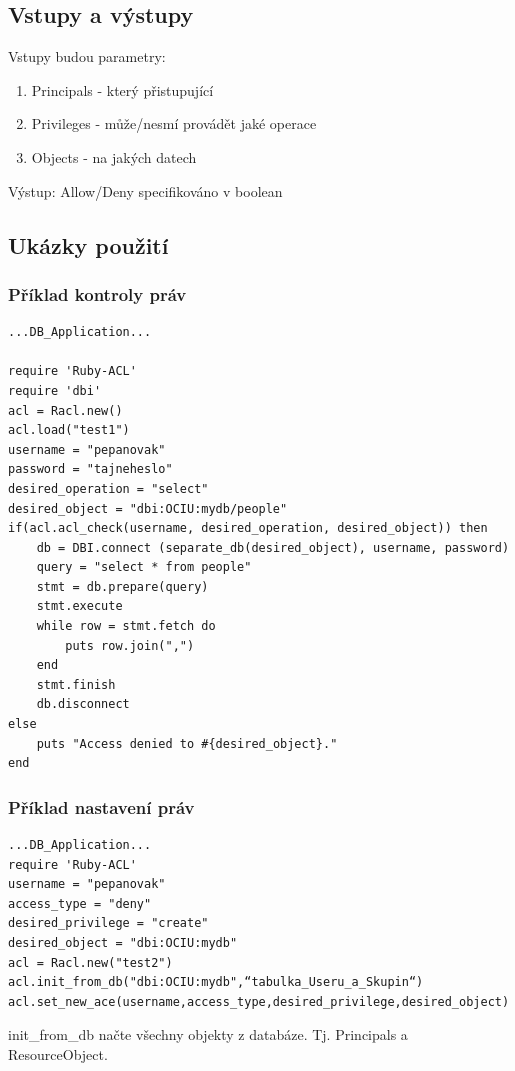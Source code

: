 \documentclass[11pt,twoside,a4paper]{book}
\begin{document}
\subsection{Vstupy a výstupy}
Vstupy budou parametry: 
\begin{enumerate}
\item Principals - který přistupující
\item Privileges - může/nesmí provádět jaké operace
\item Objects - na jakých datech
\end{enumerate}

Výstup: Allow/Deny specifikováno v boolean

\subsection{Ukázky použití}
\subsubsection{Příklad kontroly práv}
\begin{verbatim}
...DB_Application...

require 'Ruby-ACL'
require 'dbi'
acl = Racl.new()
acl.load("test1")
username = "pepanovak"
password = "tajneheslo"
desired_operation = "select"
desired_object = "dbi:OCIU:mydb/people"
if(acl.acl_check(username, desired_operation, desired_object)) then
	db = DBI.connect (separate_db(desired_object), username, password)
	query = "select * from people"
	stmt = db.prepare(query)
	stmt.execute
	while row = stmt.fetch do
		puts row.join(",")
	end
	stmt.finish
	db.disconnect
else
	puts "Access denied to #{desired_object}."
end
\end{verbatim}

\subsubsection{Příklad nastavení práv}

\begin{verbatim}
...DB_Application...
require 'Ruby-ACL'
username = "pepanovak"
access_type = "deny"
desired_privilege = "create"
desired_object = "dbi:OCIU:mydb"
acl = Racl.new("test2")
acl.init_from_db("dbi:OCIU:mydb",“tabulka_Useru_a_Skupin“)
acl.set_new_ace(username,access_type,desired_privilege,desired_object)
\end{verbatim}


init\_from\_db načte všechny objekty z databáze. Tj. Principals a ResourceObject.
\end{document}
